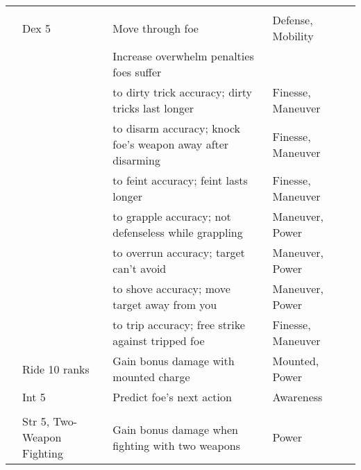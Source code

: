\begin{longtabuwrapper}
\begin{longtabu}{>{\lcol}p{10em} >{\lcol}p{15em} >{\lcol}X >{\lcol}p{6em} >{\lcol}p{3em}}
        \midrule
         &  &  &  &  \\
         & Dex 5 & Move through foe & Defense, Mobility &  \\
         & \x & Increase overwhelm penalties foes suffer & \x &  \\
         & \x &  to dirty trick accuracy; dirty tricks last longer & Finesse, Maneuver &  \\
         & \x &  to disarm accuracy; knock foe's weapon away after disarming & Finesse, Maneuver &  \\
         & \x &  to feint accuracy; feint lasts longer & Finesse, Maneuver &  \\
         & \x &  to grapple accuracy; not defenseless while grappling & Maneuver, Power &  \\
         & \x &  to overrun accuracy; target can't avoid & Maneuver, Power &  \\
         & \x &  to shove accuracy; move target away from you & Maneuver, Power &  \\
         & \x &  to trip accuracy; free strike against tripped foe & Finesse, Maneuver &  \\
         & Ride 10 ranks & Gain bonus damage with mounted charge & Mounted, Power &  \\
         & Int 5 & Predict foe's next action & Awareness &  \\

        \midrule
         &  &  &  &  \\
         & Str 5, Two-Weapon Fighting & Gain bonus damage when fighting with two weapons & Power &  \\


\end{longtabu}
\end{longtabuwrapper}
